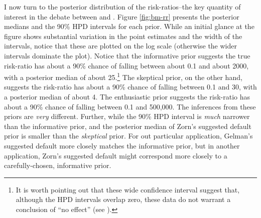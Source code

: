 \documentclass[12pt]{article}
\begin{document}
I now turn to the posterior distribution of the risk-ratios--the key quantity of interest in the debate between \cite{BellMiller2014} and \cite{Rauchhaus2009}. Figure \ref{fig:bm-rr} presents the posterior medians and the 90\% HPD intervals for each prior. While an initial glance at the figure shows substantial variation in the point estimates and the width of the intervals, notice that these are plotted on the log scale (otherwise the wider intervals dominate the plot). Notice that the informative prior suggests the true risk-ratio has about a 90\% chance of falling between about 0.1 and about 2000, with a posterior median of about 25.\footnote{It is worth pointing out that these wide confidence interval suggest that, although the HPD intervals overlap zero, these data do not warrant a conclusion of ``no effect'' (see \citealt{Rainey2014}).} The skeptical prior, on the other hand, suggests the risk-ratio has about a 90\% chance of falling between 0.1 and 30, with a posterior median of about 4. The enthusiastic prior suggests the risk-ratio has about a 90\% chance of falling between 0.1 and 500,000. The inferences from these priors are \emph{very} different. Further, while the 90\% HPD interval is \emph{much} narrower than the informative prior, and the posterior median of Zorn's suggested default prior is smaller than the \emph{skeptical} prior. For out particular application, Gelman's suggested default more closely matches the informative prior, but in another application, Zorn's suggested default might correspond more closely to a carefully-chosen, informative prior.

\end{document}
